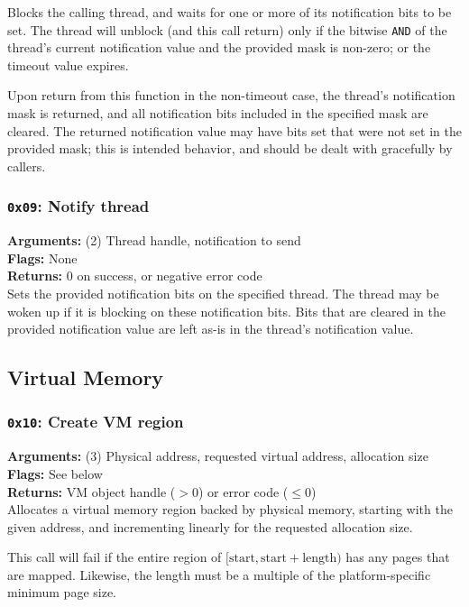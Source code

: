 \documentclass[11pt]{article}
\begin{document}
Blocks the calling thread, and waits for one or more of its notification bits to be set. The thread will unblock (and this call return) only if the bitwise \texttt{AND} of the thread's current notification value and the provided mask is non-zero; or the timeout value expires.

Upon return from this function in the non-timeout case, the thread's notification mask is returned, and all notification bits included in the specified mask are cleared. The returned notification value may have bits set that were not set in the provided mask; this is intended behavior, and should be dealt with gracefully by callers.

\subsubsection{{\tt 0x09}: Notify thread}
\textbf{Arguments:} (2) Thread handle, notification to send \\
\textbf{Flags:} None \\
\textbf{Returns:} 0 on success, or negative error code \\

Sets the provided notification bits on the specified thread. The thread may be woken up if it is blocking on these notification bits. Bits that are cleared in the provided notification value are left as-is in the thread's notification value.



\newpage
\subsection{Virtual Memory}
\subsubsection{{\tt 0x10}: Create VM region}
\textbf{Arguments:} (3) Physical address, requested virtual address, allocation size  \\
\textbf{Flags:} See below \\
\textbf{Returns:} VM object handle ($>0$) or error code ($\leq0$) \\

Allocates a virtual memory region backed by physical memory, starting with the given address, and incrementing linearly for the requested allocation size.

This call will fail if the entire region of $[\text{start}, \text{start} + \text{length})$ has any pages that are mapped. Likewise, the length must be a multiple of the platform-specific minimum page size.
\end{document}
